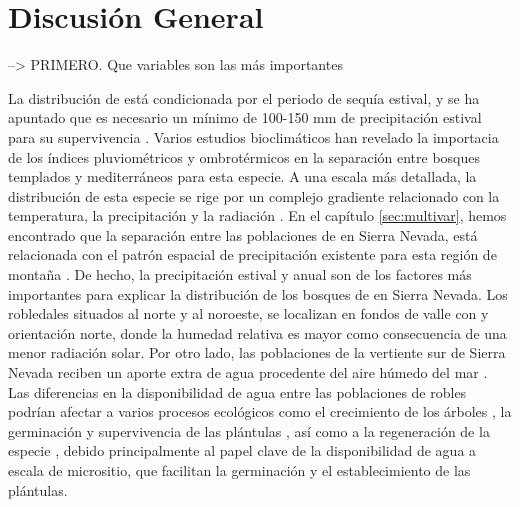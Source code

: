 %
\chapter*{\textcolor{ctcolormain}{Discusión General}}\label{sec:discussions}
\newpage


--> PRIMERO. Que variables son las más importantes

La distribución de \Qp está condicionada por el periodo de sequía estival, y se ha apuntado que es necesario un mínimo de 100-150 mm de precipitación estival para su supervivencia \autocite{BlancoCastroetal2005BosquesIbericos,GarciaJimenez20099230Robledales}. Varios estudios bioclimáticos han revelado la importacia de los índices pluviométricos y ombrotérmicos en la separación entre bosques templados y mediterráneos \autocite{delRioetal2007BioclimaticAnalysis} para esta especie. A una escala más detallada, la distribución de esta especie se rige por un complejo gradiente relacionado con la temperatura, la precipitación y la radiación \autocite{Gavilanetal2007ModellingCurrent,Urbietaetal2011MediterraneanPine}. En el capítulo \ref{sec:multivar}, hemos encontrado que la separación entre las poblaciones de \Qp en Sierra Nevada, está  relacionada con el patrón espacial de precipitación existente para esta región de montaña \autocite{Pereiraetal2016SpatialInterpolation}. De hecho, la precipitación estival y anual son de los factores más importantes para explicar la distribución de los bosques de \Qp en Sierra Nevada. Los robledales situados al norte y al noroeste, se localizan en fondos de valle con y orientación norte, donde la humedad relativa es mayor como consecuencia de una menor radiación solar. Por otro lado, las poblaciones de la vertiente sur de Sierra Nevada reciben un aporte extra de agua procedente del aire húmedo del mar \autocite{MartinezParrasMoleroMesa1982EcologiaFitosociologia}. Las diferencias en la disponibilidad de agua entre las poblaciones de robles podrían afectar a varios procesos ecológicos como el crecimiento de los árboles \autocites[ver capítulo \ref{sec:dendro} ][]{GeaIzquierdoCanellas2014LocalClimate,PerezLuqueetal2020LanduseLegacies}, la germinación y supervivencia de las plántulas \autocites{Gomez2003ImpactVertebrate, GomezAparicioetal2008OakSeedling,Mendozaetal2009SeedingExperiment}, así como a la regeneración de la especie \autocites{Gomezetal2001ProblemasRegeneracion}, debido principalmente al papel clave de la disponibilidad de agua a escala de micrositio, que facilitan la germinación y el establecimiento de las plántulas.

